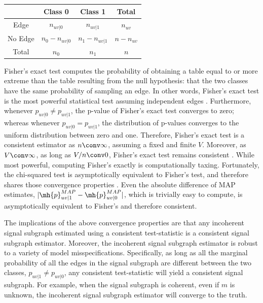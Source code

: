 \documentclass[10pt,journal,cspaper,compsoc]{IEEEtran}
\begin{document}
\begin{table}[h!]
\begin{center}
\begin{tabular}{c||c|c||c}
 & Class 0  & Class 1 & Total \\
\hline\hline
Edge & $n_{uv|0}$ & $n_{uv|1}$ & $n_{uv}$ \\ \hline
No Edge & $n_0-n_{uv|0}$ & $n_1-n_{uv|1}$ & $n-n_{uv}$ \\ \hline \hline
Total & $n_0$ & $n_1$ & $n$\\
\end{tabular}
\end{center}
\label{tab:fwpath}
\end{table}%

Fisher's exact test computes the probability of obtaining a table equal to or more extreme than the table resulting from the null hypothesis: that the two classes have the same probability of sampling an edge.  In other words, Fisher's exact test is the most powerful statistical test assuming independent edges \cite{Rice1995}.  Furthermore, whenever $p_{uv|0}\neq p_{uv|1}$, the p-value of Fisher's exact test converges to zero; whereas whenever $p_{uv|0}=p_{uv|1}$, the distribution of p-values converges to the uniform distribution between zero and one.  Therefore, Fisher's exact test is a consistent estimator as $n \conv \infty$, assuming a fixed and finite $V$.  Moreover, as $V \conv \infty$, as long as $V/n \conv 0$, Fisher's exact test remains consistent \cite{Rice1995}.  While most powerful, computing Fisher's exactly is computationally taxing.  Fortunately, the chi-squared test is asymptotically equivalent to Fisher's test, and therefore shares those convergence properties \cite{Rice1995}.  Even the absolute difference of MAP estimates, $|\mh{p}_{uv|1}^{MAP}-\mh{p}_{uv|0}^{MAP}|$, which is trivially easy to compute, is asymptotically equivalent to Fisher's \cite{Rice1995} and therefore consistent.

The implications of the above convergence properties are that any incoherent signal subgraph estimated using a consistent test-statistic is a consistent signal subgraph estimator.  Moreover, the incoherent signal subgraph estimator is robust to a variety of model misspecifications.  Specifically, as long as all the marginal probability of all the edges in the signal subgraph are different between the two classes, $p_{uv|1}\neq p_{uv|0}$, any consistent test-statistic will yield a consistent signal subgraph.  For example, when the signal subgraph is coherent, even if $m$ is unknown, the incoherent signal subgraph estimator will converge to the truth.
\end{document}
